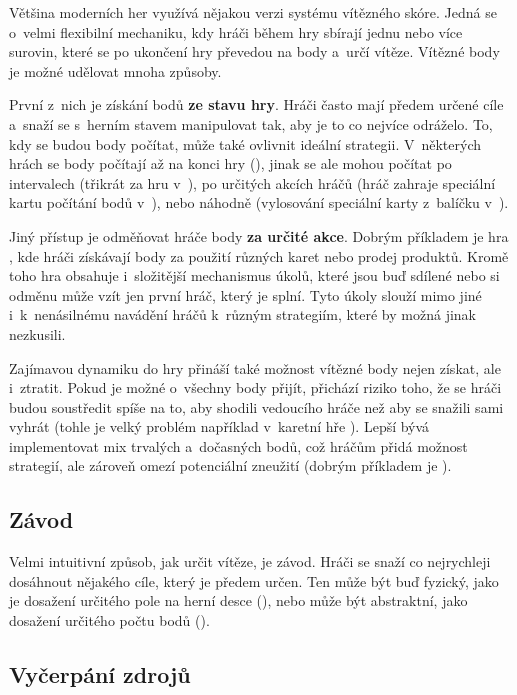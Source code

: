 Většina moderních her využívá nějakou verzi systému vítězného skóre. Jedná se o~velmi flexibilní mechaniku, kdy hráči během hry sbírají jednu nebo více surovin, které se po ukončení hry převedou na body a~určí vítěze. Vítězné body je možné udělovat mnoha způsoby.

První z~nich je získání bodů \textbf{ze stavu hry}. Hráči často mají předem určené cíle a~snaží se s~herním stavem manipulovat tak, aby je to co nejvíce odráželo. To, kdy se budou body počítat, může také ovlivnit ideální strategii. V~některých hrách se body počítají až na konci hry (), jinak se ale mohou počítat po intervalech (třikrát za hru v~), po určitých akcích hráčů (hráč zahraje speciální kartu počítání bodů v~), nebo náhodně (vylosování speciální karty z~balíčku v~).

Jiný přístup je odměňovat hráče body \textbf{za určité akce}. Dobrým příkladem je hra , kde hráči získávají body za použití různých karet nebo prodej produktů. Kromě toho hra obsahuje i~složitější mechanismus úkolů, které jsou buď sdílené nebo si odměnu může vzít jen první hráč, který je splní. Tyto úkoly slouží mimo jiné i~k~nenásilnému navádění hráčů k~různým strategiím, které by možná jinak nezkusili.

Zajímavou dynamiku do hry přináší také možnost vítězné body nejen získat, ale i~ztratit. Pokud je možné o~všechny body přijít, přichází riziko toho, že se hráči budou soustředit spíše na to, aby shodili vedoucího hráče než aby se snažili sami vyhrát (tohle je velký problém například v~karetní hře ). Lepší bývá implementovat mix trvalých a~dočasných bodů, což hráčům přidá možnost strategií, ale zároveň omezí potenciální zneužití (dobrým příkladem je ).

\subsection{Závod}
\label{subsec:end_race}

Velmi intuitivní způsob, jak určit vítěze, je závod. Hráči se snaží co nejrychleji dosáhnout nějakého cíle, který je předem určen. Ten může být buď fyzický, jako je dosažení určitého pole na herní desce (), nebo může být abstraktní, jako dosažení určitého počtu bodů ().

\subsection{Vyčerpání zdrojů}
\label{subsec:end_resource_depletion}

